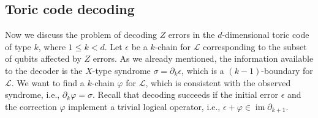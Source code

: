 \documentclass[onecolumn,letterpaper,11pt,accepted=2022-12-19]{quantumarticle}
\DeclareMathOperator{\im}{im}
\renewcommand{\phi}{\varphi}
\theoremstyle{definition}
\theoremstyle{lemma}
\theoremstyle{theorem}
\theoremstyle{corollary}
\begin{document}
\subsection{Toric code decoding}

Now we discuss the problem of decoding $Z$ errors in the $d$-dimensional toric code of type $k$, where $1\leq k < d$.
Let $\epsilon$ be a $k$-chain for $\mathcal{L}$ corresponding to the subset of qubits affected by $Z$ errors.
As we already mentioned, the information available to the decoder is the $X$-type syndrome $\sigma = \partial_k \epsilon$, which is a $(k-1)$-boundary for $\mathcal{L}$.
We want to find a $k$-chain $\varphi$ for $\mathcal{L}$, which is consistent with the observed syndrome, i.e., $\partial_k \varphi = \sigma$.
Recall that decoding succeeds if the initial error $\epsilon$ and the correction $\phi$ implement a trivial logical operator, i.e., $\epsilon + \phi \in \im\partial_{k+1}$.
\end{document}
